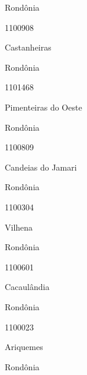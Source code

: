 \documentclass[
  letterpaper,
]{report}
\begin{document}
\n    

\n    

\n      

Rondônia

\n      

1100908

\n      

Castanheiras

\n    

\n    

\n      

Rondônia

\n      

1101468

\n      

Pimenteiras do Oeste

\n    

\n    

\n      

Rondônia

\n      

1100809

\n      

Candeias do Jamari

\n    

\n    

\n      

Rondônia

\n      

1100304

\n      

Vilhena

\n    

\n    

\n      

Rondônia

\n      

1100601

\n      

Cacaulândia

\n    

\n    

\n      

Rondônia

\n      

1100023

\n      

Ariquemes

\n    

\n    

\n      

Rondônia

\n      
\end{document}

